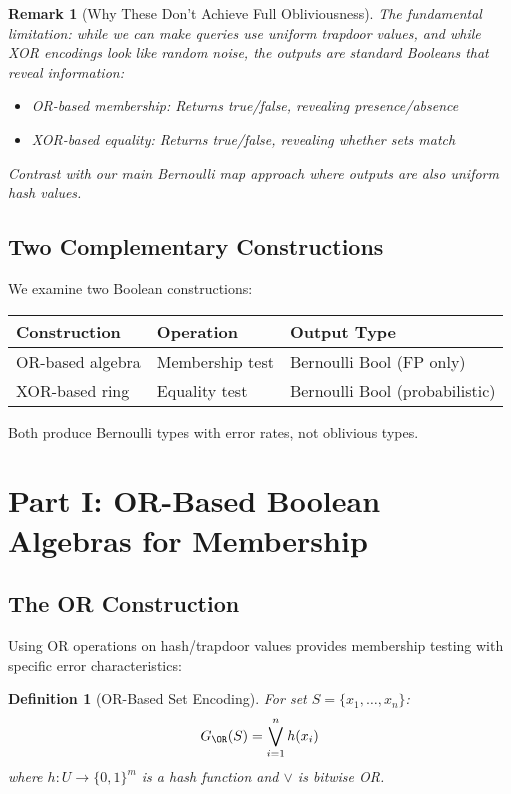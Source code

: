 \documentclass[11pt,final,hidelinks]{article}
\newtheorem{definition}[theorem]{Definition}
\newtheorem{remark}[theorem]{Remark}
\begin{document}
\begin{remark}[Why These Don't Achieve Full Obliviousness]
The fundamental limitation: while we can make queries use uniform trapdoor values, and while XOR encodings look like random noise, the outputs are standard Booleans that reveal information:
\begin{itemize}
    \item OR-based membership: Returns true/false, revealing presence/absence
    \item XOR-based equality: Returns true/false, revealing whether sets match
\end{itemize}
Contrast with our main Bernoulli map approach where outputs are also uniform hash values.
\end{remark}

\subsection{Two Complementary Constructions}

We examine two Boolean constructions:

\begin{center}
\begin{tabular}{lll}
\toprule
\textbf{Construction} & \textbf{Operation} & \textbf{Output Type} \\
\midrule
OR-based algebra & Membership test & Bernoulli Bool (FP only) \\
XOR-based ring & Equality test & Bernoulli Bool (probabilistic) \\
\bottomrule
\end{tabular}
\end{center}

Both produce Bernoulli types with error rates, not oblivious types.

\section{Part I: OR-Based Boolean Algebras for Membership}

\subsection{The OR Construction}

Using OR operations on hash/trapdoor values provides membership testing with specific error characteristics:

\begin{definition}[OR-Based Set Encoding]
For set $S = \{x_1, \ldots, x_n\}$:
\begin{equation}
G_{\OR}(S) = \bigvee_{i=1}^{n} h(x_i)
\end{equation}
where $h: U \to \{0,1\}^m$ is a hash function and $\vee$ is bitwise OR.
\end{definition}
\end{document}
